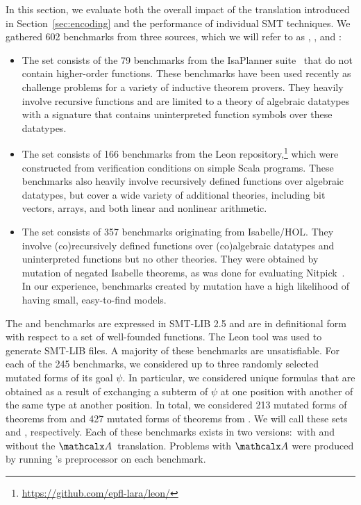 In this section, we evaluate both the overall impact of the translation
introduced in Section~\ref{sec:encoding} and the performance of individual SMT
techniques.
%
We gathered 602 benchmarks from three sources, which we will refer to as
\ip, \leon, and \isanun:
\begin{itemize}
\item
The \ip{} set consists of the 79 benchmarks from the IsaPlanner
suite~\cite{DBLP:conf/itp/JohanssonDB10} that do not contain higher-order
functions. These benchmarks have been used recently as challenge problems for a
variety of inductive theorem provers. They heavily involve
recursive functions and are limited to a theory of algebraic datatypes
with a signature that contains uninterpreted function symbols over these datatypes.

\smallskip

\item
The \leon{} set consists of 166
benchmarks from the Leon repository,\footnote{%
\url{https://github.com/epfl-lara/leon/}} which were constructed from
verification conditions on simple Scala programs. These benchmarks also
heavily involve recursively defined functions over algebraic datatypes,
but cover a wide variety of additional theories, including bit vectors, arrays, and
both linear and nonlinear arithmetic.

\smallskip

\item
The \isanun{} set consists of 357 benchmarks originating from Isabelle/HOL. They
involve (co)recursively defined functions over (co)algebraic datatypes and
uninterpreted functions but no other theories. They were obtained by mutation
of negated Isabelle theorems, as was done for evaluating
Nitpick~\cite{blanchette-nipkow-2010}. 
In our experience, benchmarks created by mutation have a
high likelihood of having small, easy-to-find models.
\end{itemize}

The \ip{} and \leon{} benchmarks are expressed in SMT-LIB 2.5 and are in
definitional form with respect to a set of well-founded functions.
The Leon tool was used to generate SMT-LIB files.
A majority of these benchmarks are unsatisfiable.
For each of the 245 benchmarks,
we considered up to three randomly selected
mutated forms of its goal $\psi$. In particular, we considered unique
formulas that are obtained as a result of exchanging a subterm of $\psi$ at
one position with another of the same type at another position.
In total, we considered 213 mutated forms of
theorems from \ip and 427 mutated forms of theorems from \leon. We will
call these sets \ipm and \leonm, respectively. Each of these benchmarks exists
in two versions:\ with and without the $\conv$~translation. Problems with
$\conv$ were produced by running \cvc's preprocessor %
on each benchmark.

